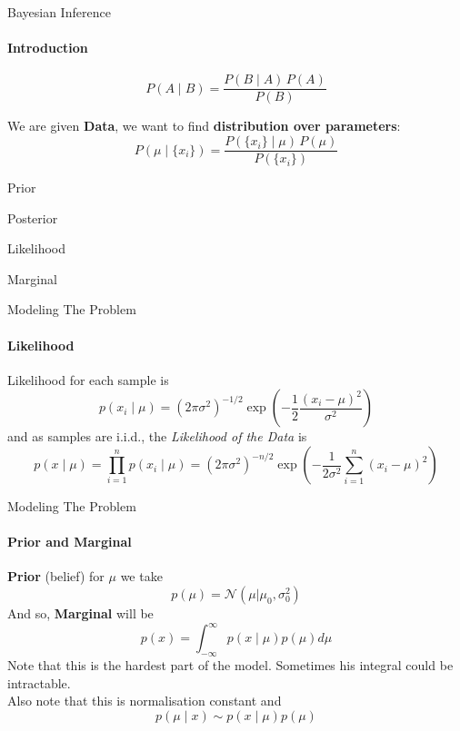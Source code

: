 \begin{frame}{Bayesian Inference}
\framesubtitle{Introduction}
\begin{theorem}
\begin{equation*}
P(A \mid B) = \frac{P(B \mid A) \, P(A)}{P(B)}
\end{equation*}
\end{theorem}

\begin{example}
We are given \textbf{Data}, we want to find \textbf{distribution over parameters}:
\begin{equation*}
    P( \mu \mid \{x_i\} ) = \frac{P( \{x_i\} \mid \mu ) \, P(\mu)}{P(\{x_i\})}
\end{equation*}
\end{example}

\begin{description}[leftmargin=1cm, labelwidth=3cm]
\item[$P(\mu)$] Prior
\item[$P( \mu \mid \{x_i\} ) $] Posterior
\item[$P( \{x_i\} \mid \mu )$] Likelihood
\item[$P(\{x_i\})$] Marginal
\end{description}
\end{frame}




\begin{frame}{Modeling The Problem}
\framesubtitle{Likelihood}
Likelihood for each sample is
\begin{equation*}
    p\left(x_{i} \mid \mu\right)=\left(2 \pi \sigma^{2}\right)^{-1 / 2} \exp \left(-\frac{1}{2} \frac{\left(x_{i}-\mu\right)^{2}}{\sigma^{2}}\right)
\end{equation*}
\pause
and as samples are i.i.d., the \textit{Likelihood of the Data} is
\pause
\begin{equation*}
    p(x \mid \mu)=\prod_{i=1}^{n} p\left(x_{i} \mid \mu\right)=\left(2 \pi \sigma^{2}\right)^{-n / 2} \exp \left(-\frac{1}{2 \sigma^{2}} \sum_{i=1}^{n}\left(x_{i}-\mu\right)^{2}\right)
\end{equation*}
    
\end{frame}

\begin{frame}{Modeling The Problem}
\framesubtitle{Prior and Marginal}
\textbf{Prior} (belief) for $\mu$ we take
\begin{equation*}
    p(\mu)=\mathcal{N}\left(\mu | \mu_{0}, \sigma_{0}^{2}\right)
\end{equation*}
\pause
And so, \textbf{Marginal} will be
\begin{equation*}
    p(x) = \int_{-\infty}^{\infty}p(x \mid \mu) p(\mu) d\mu    
\end{equation*}
\pause
Note that this is the hardest part of the model. Sometimes his integral could be intractable. \\
Also note that this is normalisation constant and
\begin{equation*}
    p(\mu \mid x) \sim p(x \mid \mu) p(\mu)
\end{equation*}
\end{frame}

